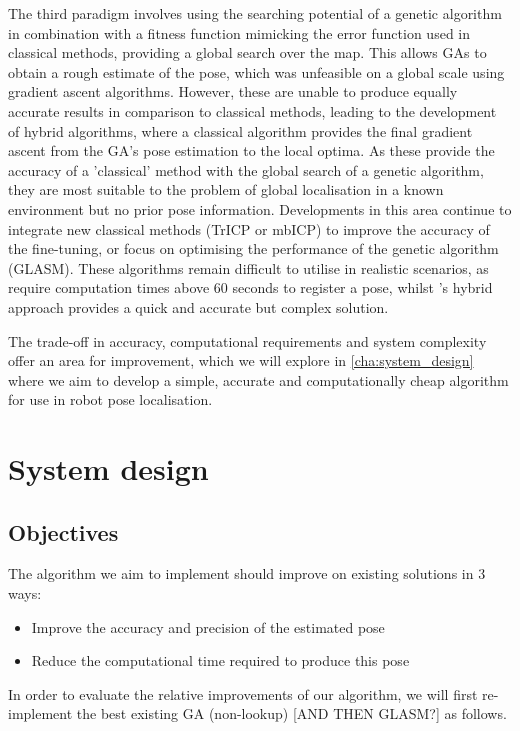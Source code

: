 \documentclass[authoryearcitations]{UoYCSproject}
\begin{document}
The third paradigm involves using the searching potential of a genetic algorithm in combination with a fitness function mimicking the error function used in classical methods, providing a global search over the map. This allows GAs to obtain a rough estimate of the pose, which was unfeasible on a global scale using gradient ascent algorithms. However, these are unable to produce equally accurate results in comparison to classical methods, leading to the development of hybrid algorithms, where a classical algorithm provides the final gradient ascent from the GA's pose estimation to the local optima. As these provide the accuracy of a 'classical' method with the global search of a genetic algorithm, they are most suitable to the problem of global localisation in a known environment but no prior pose information. Developments in this area continue to integrate new classical methods (TrICP or mbICP) to improve the accuracy of the fine-tuning, or focus on optimising the performance of the genetic algorithm (GLASM). These algorithms remain difficult to utilise in realistic scenarios, as \citet{Chow2004-xc} require computation times above 60 seconds to register a pose, whilst \citet{Lenac2011-co}'s hybrid approach provides a quick and accurate but complex solution. 

The trade-off in accuracy, computational requirements and system complexity offer an area for improvement, which we will explore in \autoref{cha:system_design} where we aim to develop a simple, accurate and computationally cheap algorithm for use in robot pose localisation.

\clearpage

\chapter{System design}
\label{cha:system_design}
\section{Objectives}
\label{sec:objectives}
The algorithm we aim to implement should improve on existing solutions in 3 ways:
\begin{itemize}
	\item Improve the accuracy and precision of the estimated pose
	\item Reduce the computational time required to produce this pose
\end{itemize}
In order to evaluate the relative improvements of our algorithm, we will first re-implement the best existing GA (non-lookup) [AND THEN GLASM?] as follows.
\end{document}
